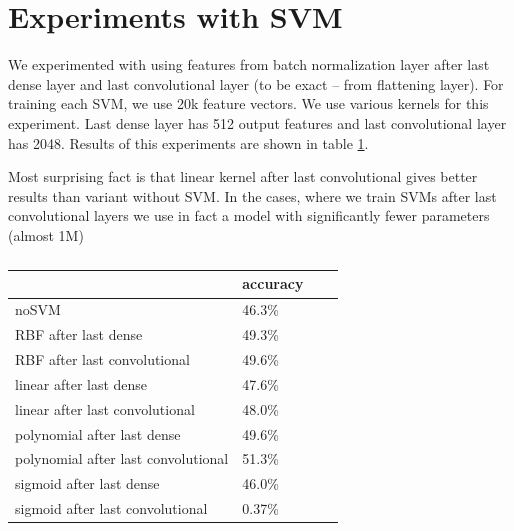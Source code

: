 \documentclass[a4paper]{article}
\begin{document}
\section{Experiments with SVM}

We experimented with using features from batch normalization layer after last dense layer 
and last convolutional layer (to be exact -- from flattening layer).
For training each SVM, we use 20k feature vectors.
We use various kernels for this experiment.
Last dense layer has 512 output features and last convolutional layer has 2048.
Results of this experiments are shown in table \ref{table:svm}.

Most surprising fact is that linear kernel after last convolutional gives
better results than variant without SVM.
In the cases, where we train SVMs after last convolutional layers we
use in fact a model with significantly fewer parameters (almost 1M)

\begin{table}[!hbt]
    \caption{ 
    \label{table:svm}
    }
\begin{center}
    \begin{tabular}{| l | l | l | l |}
    \hline
    &accuracy \\
    \hline
        noSVM & 46.3\% \\
        RBF after last dense & 49.3\% \\
        RBF after last convolutional & 49.6\% \\
        linear after last dense & 47.6\% \\
        linear after last convolutional & 48.0\% \\
        polynomial after last dense & 49.6\% \\
        polynomial after last convolutional & 51.3\% \\
        sigmoid after last dense & 46.0\% \\
        sigmoid after last convolutional & 0.37\% \\
    \hline
    \end{tabular}
\end{center}
\end{table}
\end{document}

